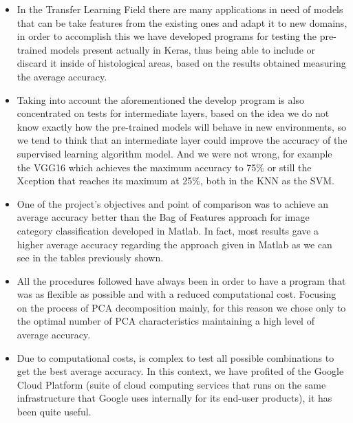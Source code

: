 \documentclass[12pt]{article} %
\begin{document}
\begin{itemize}

\item In the Transfer Learning Field there are many applications in need of models that can be take features from the existing ones and adapt it to new domains, in order to accomplish this we have developed programs for testing the pre-trained models present actually in Keras, thus being able to include or discard it inside of histological areas, based on the results obtained measuring the average accuracy.

\item Taking into account the aforementioned the develop program is also concentrated on tests for intermediate layers, based on the idea we do not know exactly how the pre-trained models will behave in new environments, so we tend to think that an intermediate layer could improve the accuracy of the supervised learning algorithm model.  And we were not wrong, for example the VGG16 which achieves the maximum accuracy to 75\% or still the Xception that reaches its maximum at 25\%, both in the KNN as the SVM.

\item One of the project's objectives and point of comparison was to achieve an average accuracy better than the Bag of Features approach for image category classification developed in Matlab. In fact, most results gave a higher average accuracy regarding the approach given in Matlab as we can see in the tables previously shown.

\item All the procedures followed have always been in order to have a program that was as flexible as possible and with a reduced computational cost. Focusing on the process of PCA decomposition mainly, for this reason we chose only to the optimal number of PCA characteristics maintaining a high level of average accuracy.

\item Due to computational costs, is complex to test all possible combinations to get the best average accuracy. In this context, we have profited of the Google Cloud Platform (suite of cloud computing services that runs on the same infrastructure that Google uses internally for its end-user products), it has been quite useful.

\end{itemize}
\end{document}
